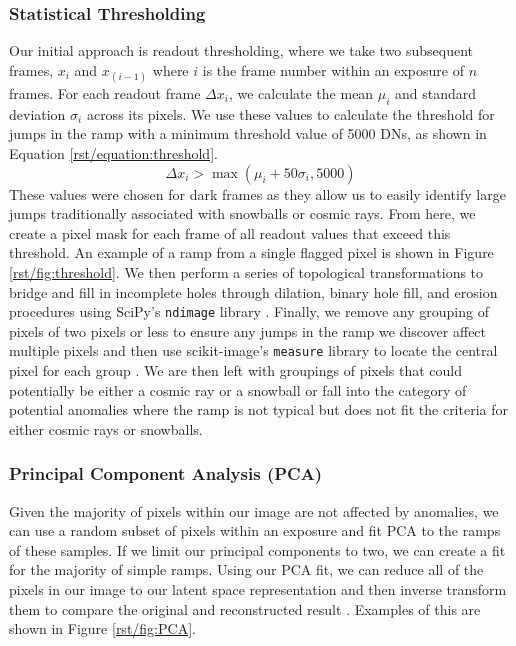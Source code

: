 \subsubsection{Statistical Thresholding}
Our initial approach is readout thresholding, where we take two subsequent frames, $x_i$ and $x_{(i-1)}$ where $i$ is the frame number within an exposure of $n$ frames.
For each readout frame $\Delta x_i$, we calculate the mean $\mu_i$ and standard deviation $\sigma_i$ across its pixels. 
We use these values to calculate the threshold for jumps in the ramp with a minimum threshold value of 5000 DNs, as shown in Equation \ref{rst/equation:threshold}.
\begin{equation}
    \label{rst/equation:threshold}
    \Delta x_i > \max(\mu_i + 50 \sigma_i, 5000)
\end{equation}
These values were chosen for dark frames as they allow us to easily identify large jumps traditionally associated with snowballs or cosmic rays. 
From here, we create a pixel mask for each frame of all readout values that exceed this threshold. 
An example of a ramp from a single flagged pixel is shown in Figure \ref{rst/fig:threshold}.
We then perform a series of topological transformations to bridge and fill in incomplete holes through dilation, binary hole fill, and erosion procedures using SciPy's \texttt{ndimage} library \parencite{2020SciPy-NMeth}.
Finally, we remove any grouping of pixels of two pixels or less to ensure any jumps in the ramp we discover affect multiple pixels and then use scikit-image's \texttt{measure} library to locate the central pixel for each group \parencite{scikit-image}.
We are then left with groupings of pixels that could potentially be either a cosmic ray or a snowball or fall into the category of potential anomalies where the ramp is not typical but does not fit the criteria for either cosmic rays or snowballs.

\subsubsection{Principal Component Analysis (PCA)}
Given the majority of pixels within our image are not affected by anomalies, we can use a random subset of pixels within an exposure and fit PCA to the ramps of these samples.
If we limit our principal components to two, we can create a fit for the majority of simple ramps. 
Using our PCA fit, we can reduce all of the pixels in our image to our latent space representation and then inverse transform them to compare the original and reconstructed result \parencite{wold1987principal}.
Examples of this are shown in Figure \ref{rst/fig:PCA}. 

